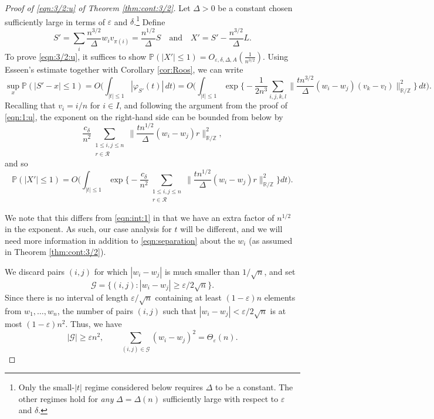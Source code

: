 \documentclass[10pt,a4paper]{amsart}
\newcommand\CG{{\mathcal G}}
\newcommand\CR{{\mathcal R}}
\renewcommand\P{{\mathbb{P}}}
\newcommand\R{{\mathbb{R}}}
\newcommand\Z{{\mathbb{Z}}}
\newcommand\eps{{\varepsilon}}
\begin{document}
\begin{proof}[Proof of \eqref{eqn:3/2:u} of Theorem \ref{thm:cont:3/2}]
Let $\Delta>0$ be a constant chosen sufficiently large in terms of $\eps$ and $\delta$.\footnote{Only the small-$|t|$ regime considered below requires $\Delta$ to be a constant. The other regimes hold for \emph{any} $\Delta = \Delta(n)$ sufficiently large with respect to $\eps$ and $\delta$.} Define
\[
S' = \sum_{i} \frac{n^{3/2}}{\Delta}w_{i} v_{\pi(i)} =\frac{n^{1/2}}{\Delta} S
\quad\text{and}\quad
X' = S' - \frac{n^{3/2}}{\Delta}L.
\]
To prove \eqref{eqn:3/2:u}, it suffices to show $\P(|X'| \le 1)=O_{\eps,\delta,\Delta,A}(\frac{1}{n^{3/2}})$.
Using Esseen's estimate together with Corollary \ref{cor:Roos}, we can write
\[
\sup_{x} \P(|S' - x| \le 1)
= O\Big(\int_{|t| \le 1} |\varphi_{S'}(t)| \, dt\Big)
=O\Big(\int_{|t| \le 1} \exp\Big\{- \frac{1}{2n^{3}} \sum_{i,j,k,l} \Big\|\frac{t n^{3/2}}{\Delta} (w_{i}-w_{j})(v_{k}-v_{l})\Big\|_{\R/\Z}^{2}\Big\} \, dt\Big).
\]
Recalling that $v_i = i/n$ for $i\in I$, and following the argument from the proof of \eqref{eqn:1:u}, the exponent on the right-hand side can be bounded from below by
\[
\frac{c_{\delta}}{n^{2}} \sum_{\substack{1 \le i,j \le n \\ r\in \CR}}
\Big\| \frac{t n^{1/2}}{\Delta} (w_{i} - w_{j}) r \Big\|_{\R/\Z}^{2},
\]
and so
\begin{equation}\label{eqn:int:3/2}
\P(|X'| \le 1)  
= O\Big(\int_{|t| \le 1} \exp\Big\{ -\frac{c_{\delta}}{n^{2}} \sum_{\substack{1 \le i,j \le n \\ r\in \CR}} \Big\| \frac{t n^{1/2}}{\Delta}(w_{i} - w_{j}) r \Big\|_{\R/\Z}^{2} \Big\} dt\Big).
\end{equation}

We note that this differs from \eqref{eqn:int:1} in that we have an extra factor of $n^{1/2}$ in the exponent.  
As such, our case analysis for $t$ will be different, and we will need more information in addition to \eqref{eqn:separation} about the $w_{i}$ (as assumed in Theorem \ref{thm:cont:3/2}).

We discard pairs $(i,j)$ for which $|w_{i}-w_{j}|$ is much smaller than $1/\sqrt{n}$, and set
\[
\CG = \{ (i,j) : |w_{i}-w_{j}| \ge \eps / 2\sqrt{n} \}.
\]
Since there is no interval of length $\eps/\sqrt{n}$ containing at least $(1-\eps)n$ elements from $w_{1},\dots,w_{n}$, the number of pairs $(i,j)$ such that $|w_{i}-w_{j}| < \eps/2\sqrt{n}$ is at most $(1-\eps)n^{2}$.
Thus, we have
\begin{equation}\label{eqn:3/2:u:starting}
|\CG|\ge \eps n^2, \qquad \sum_{(i,j)\in \CG} (w_{i}-w_{j})^{2} =\Theta_{\eps}(n).
\end{equation}


\end{proof}
\end{document}
